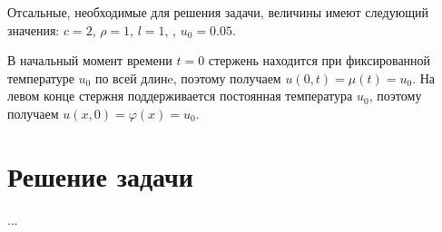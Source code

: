 \documentclass[a4paper,12pt]{report}
\begin{document}
Отсальные, необходимые для решения задачи, величины имеют следующий значения:
$c=2$, $\rho = 1$,  $l = 1$, , $u_{0} = 0.05$.

В начальный момент времени $t = 0$ стержень находится при фиксированной температуре $u_{0}$ по всей длинe,
поэтому получаем $u(0, t) = \mu (t) = u_{0}$. На левом конце стержня поддерживается постоянная температура 
$u_{0}$, поэтому получаем $u(x, 0) = \varphi (x) = u_{0}$.

\chapter{Решение задачи}
...
\end{document}
